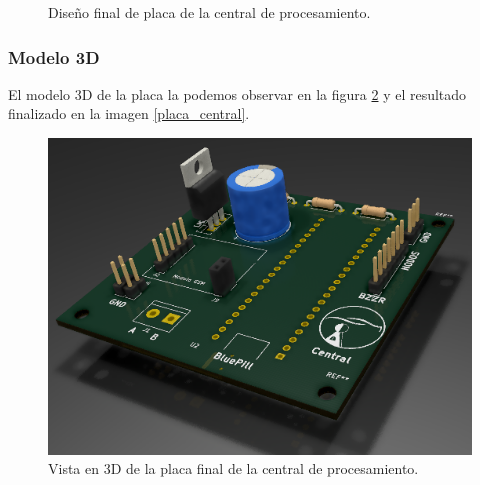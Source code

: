 \begin{figure}[!h]
\begin{center}
    \caption{Diseño final de placa de la central de procesamiento.}
	\label{im:pcb-final}
\end{center}
\end{figure}

\subsubsection{Modelo 3D}
El modelo 3D de la placa la podemos observar en la figura \ref{im:mod-3d-central} y el resultado finalizado en la imagen \ref{placa_central}.

\begin{figure}[!h]
	\centering
	\includegraphics[scale=.55]{images/central/Central-perspectiva.png}
    \caption{Vista en 3D de la placa final de la central de procesamiento.}
	\label{im:mod-3d-central}
\end{figure}

